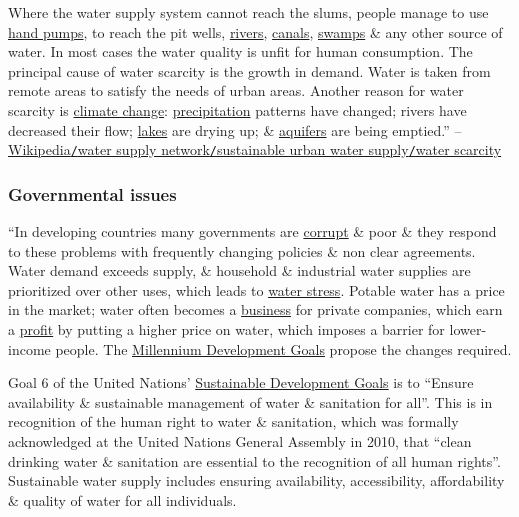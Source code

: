 \documentclass[oneside]{book}
\numberwithin{equation}{section}
\begin{document}
Where the water supply system cannot reach the slums, people manage to use \href{https://en.wikipedia.org/wiki/Hand_pump}{hand pumps}, to reach the pit wells, \href{https://en.wikipedia.org/wiki/River}{rivers}, \href{https://en.wikipedia.org/wiki/Canal}{canals}, \href{https://en.wikipedia.org/wiki/Swamp}{swamps} \& any other source of water. In most cases the water quality is unfit for human consumption. The principal cause of water scarcity is the growth in demand. Water is taken from remote areas to satisfy the needs of urban areas. Another reason for water scarcity is \href{https://en.wikipedia.org/wiki/Climate_change}{climate change}: \href{https://en.wikipedia.org/wiki/Precipitation}{precipitation} patterns have changed; rivers have decreased their flow; \href{https://en.wikipedia.org/wiki/Lake}{lakes} are drying up; \& \href{https://en.wikipedia.org/wiki/Aquifer}{aquifers} are being emptied.'' -- \href{https://en.wikipedia.org/wiki/Water_supply_network#Water_scarcity}{Wikipedia\texttt{/}water supply network\texttt{/}sustainable urban water supply\texttt{/}water scarcity}

\subsubsection{Governmental issues}
``In developing countries many governments are \href{https://en.wikipedia.org/wiki/Corruption_(politics)}{corrupt} \& poor \& they respond to these problems with frequently changing policies \& non clear agreements. Water demand exceeds supply, \& household \& industrial water supplies are prioritized over other uses, which leads to \href{https://en.wikipedia.org/wiki/Water_stress}{water stress}. Potable water has a price in the market; water often becomes a \href{https://en.wikipedia.org/wiki/Business}{business} for private companies, which earn a \href{https://en.wikipedia.org/wiki/Profit_(accounting)}{profit} by putting a higher price on water, which imposes a barrier for lower-income people. The \href{https://en.wikipedia.org/wiki/Millennium_Development_Goals}{Millennium Development Goals} propose the changes required.

Goal 6 of the United Nations' \href{https://en.wikipedia.org/wiki/Sustainable_Development_Goals}{Sustainable Development Goals} is to ``Ensure availability \& sustainable management of water \& sanitation for all''. This is in recognition of the human right to water \& sanitation, which was formally acknowledged at the United Nations General Assembly in 2010, that ``clean drinking water \& sanitation are essential to the recognition of all human rights''. Sustainable water supply includes ensuring availability, accessibility, affordability \& quality of water for all individuals.
\end{document}
